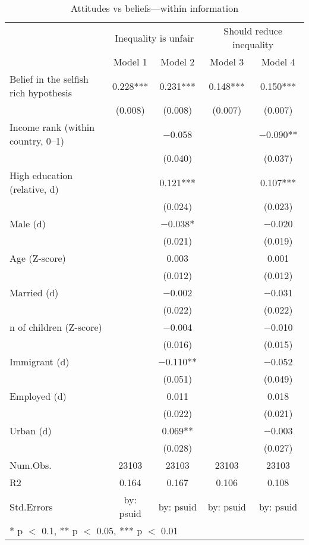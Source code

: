 \begin{table}

\caption{Attitudes vs beliefs---within information}
\centering
\begin{tabular}[t]{lcccc}
\toprule
\multicolumn{1}{c}{ } & \multicolumn{2}{c}{Inequality is unfair} & \multicolumn{2}{c}{Should reduce inequality} \\
\cmidrule(l{3pt}r{3pt}){2-3} \cmidrule(l{3pt}r{3pt}){4-5}
  & Model 1 & Model 2 & Model 3 & Model 4\\
\midrule
Belief in the selfish rich hypothesis & \num{0.228}*** & \num{0.231}*** & \num{0.148}*** & \num{0.150}***\\
 & (\num{0.008}) & (\num{0.008}) & (\num{0.007}) & (\num{0.007})\\
Income rank (within country, 0--1) &  & \num{-0.058} &  & \num{-0.090}**\\
 &  & (\num{0.040}) &  & (\num{0.037})\\
High education (relative, d) &  & \num{0.121}*** &  & \num{0.107}***\\
 &  & (\num{0.024}) &  & (\num{0.023})\\
Male (d) &  & \num{-0.038}* &  & \num{-0.020}\\
 &  & (\num{0.021}) &  & (\num{0.019})\\
Age (Z-score) &  & \num{0.003} &  & \num{0.001}\\
 &  & (\num{0.012}) &  & (\num{0.012})\\
Married (d) &  & \num{-0.002} &  & \num{-0.031}\\
 &  & (\num{0.022}) &  & (\num{0.022})\\
n of children (Z-score) &  & \num{-0.004} &  & \num{-0.010}\\
 &  & (\num{0.016}) &  & (\num{0.015})\\
Immigrant (d) &  & \num{-0.110}** &  & \num{-0.052}\\
 &  & (\num{0.051}) &  & (\num{0.049})\\
Employed (d) &  & \num{0.011} &  & \num{0.018}\\
 &  & (\num{0.022}) &  & (\num{0.021})\\
Urban (d) &  & \num{0.069}** &  & \num{-0.003}\\
 &  & (\num{0.028}) &  & (\num{0.027})\\
\midrule
Num.Obs. & \num{23103} & \num{23103} & \num{23103} & \num{23103}\\
R2 & \num{0.164} & \num{0.167} & \num{0.106} & \num{0.108}\\
Std.Errors & by: psuid & by: psuid & by: psuid & by: psuid\\
\bottomrule
\multicolumn{5}{l}{\rule{0pt}{1em}* p $<$ 0.1, ** p $<$ 0.05, *** p $<$ 0.01}\\
\end{tabular}
\end{table}